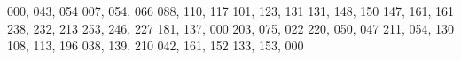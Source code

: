\usepackage{xcolor}
\definecolor{base03}{RGB}  {000, 043, 054}
\definecolor{base02}{RGB}  {007, 054, 066}
\definecolor{base01}{RGB}  {088, 110, 117}
\definecolor{base00}{RGB}  {101, 123, 131}
\definecolor{base0}{RGB}   {131, 148, 150}
\definecolor{base1}{RGB}   {147, 161, 161}
\definecolor{base2}{RGB}   {238, 232, 213}
\definecolor{base3}{RGB}   {253, 246, 227}
\definecolor{yellow}{RGB}  {181, 137, 000}
\definecolor{orange}{RGB}  {203, 075, 022}
\definecolor{red}{RGB}     {220, 050, 047}
\definecolor{magenta}{RGB} {211, 054, 130}
\definecolor{violet}{RGB}  {108, 113, 196}
\definecolor{blue}{RGB}    {038, 139, 210}
\definecolor{cyan}{RGB}    {042, 161, 152}
\definecolor{green}{RGB}   {133, 153, 000}
